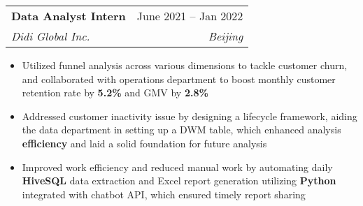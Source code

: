 \documentclass[letterpaper,11pt]{article}
\makeatletter
\newcommand{\resumeItem}[1]{
  \item\small{
    {#1 \vspace{-2pt}}
  }
}
\newcommand{\resumeSubheading}[4]{
  \vspace{-2pt}\item
    \begin{tabular*}{0.97\textwidth}[t]{l@{\extracolsep{\fill}}r}
      \textbf{#1} & #2 \\
      \textit{\small#3} & \textit{\small #4} \\
    \end{tabular*}\vspace{-7pt}
}
\newcommand{\resumeSubSubheading}[2]{
    \item
    \begin{tabular*}{0.97\textwidth}{l@{\extracolsep{\fill}}r}
      \textit{\small#1} & \textit{\small #2} \\
    \end{tabular*}\vspace{-7pt}
}
\newcommand{\resumeSubHeadingListEnd}{\end{itemize}}
\newcommand{\resumeItemListStart}{\begin{itemize}}
\newcommand{\resumeItemListEnd}{\end{itemize}\vspace{-5pt}}
\makeatother
\begin{document}
    \resumeSubheading
      {Data Analyst Intern}{June 2021 -- Jan 2022}
      {Didi Global Inc.}{Beijing}
      \resumeItemListStart
        \resumeItem{Utilized funnel analysis across various dimensions to tackle customer churn, and collaborated with operations department to boost monthly customer retention rate by \textbf{5.2\%} and GMV by \textbf{2.8\%}}
        \resumeItem{Addressed customer inactivity issue by designing a lifecycle framework, aiding the data department in setting up a DWM table, which enhanced analysis \textbf{efficiency} and laid a solid foundation for future analysis}
        \resumeItem{Improved work efficiency and reduced manual work by automating daily \textbf{HiveSQL} data extraction and Excel report generation utilizing \textbf{Python} integrated with chatbot API, which ensured timely report sharing}
      \resumeItemListEnd
      

\end{document}

